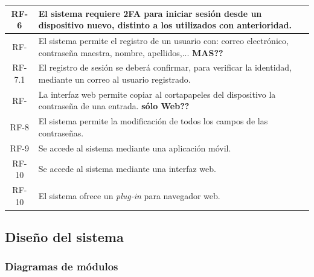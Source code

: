 \documentclass{article}
\begin{document}
\begin{table}[H]
\begin{tabular}{| c | p{30em} |}
        RF-6 & El sistema requiere 2FA para iniciar sesión desde un dispositivo nuevo, distinto a los utilizados con anterioridad. \\ \hline
        RF- & El sistema permite el registro de un usuario con: correo electrónico, contraseña maestra, nombre, apellidos,... \textbf{MAS??}\\ \hline %
        RF-7.1 & El registro de sesión se deberá confirmar, para verificar la identidad, mediante un correo al usuario registrado. \\ \hline
        RF- & La interfaz web permite copiar al cortapapeles del dispositivo la contraseña de una entrada. \textbf{sólo Web??}\\ \hline %
        RF-8 & El sistema permite la modificación de todos los campos de las contraseñas. \\ \hline
        RF-9 & Se accede al sistema mediante una aplicación móvil. \\ \hline
        RF-10 & Se accede al sistema mediante una interfaz web. \\ \hline
        RF-10 & El sistema ofrece un \textit{plug-in} para navegador web. \\ \hline
    \end{tabular}
\end{table}

\subsection{Diseño del sistema}



\subsubsection*{Diagramas de módulos}
\end{document}
